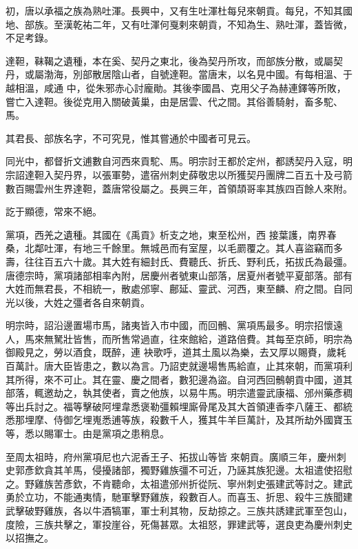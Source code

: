 \begin{pinyinscope}
 初，唐以承福之族為熟吐渾。長興中，又有生吐渾杜每兒來朝貢。每兒，不知其國地、部族。至漢乾祐二年，又有吐渾何戛剌來朝貢，不知為生、熟吐渾，蓋皆微，不足考錄。



 達靼，靺鞨之遺種，本在奚、契丹之東北，後為契丹所攻，而部族分散，或屬契丹，或屬渤海，別部散居陰山者，自號達靼。當唐末，以名見中國。有每相溫、于越相溫，咸通
 中，從朱邪赤心討龐勛。其後李國昌、克用父子為赫連鐸等所敗，嘗亡入達靼。後從克用入關破黃巢，由是居雲、代之間。其俗善騎射，畜多駝、馬。



 其君長、部族名字，不可究見，惟其嘗通於中國者可見云。



 同光中，都督折文逋數自河西來貢駝、馬。明宗討王都於定州，都誘契丹入寇，明宗詔達靼入契丹界，以張軍勢，遣宿州刺史薛敬忠以所獲契丹團牌二百五十及弓箭數百賜雲州生界達靼，蓋唐常役屬之。長興三年，首領頡哥率其族四百餘人來附。



 訖于顯德，常來不絕。



 黨項，西羌之遺種。其國在《禹貢》析支之地，東至松州，西
 接葉護，南界春桑，北鄰吐渾，有地三千餘里。無城邑而有室屋，以毛罽覆之。其人喜盜竊而多壽，往往百五六十歲。其大姓有細封氏、費聽氏、折氏、野利氏，拓拔氏為最彊。唐德宗時，黨項諸部相率內附，居慶州者號東山部落，居夏州者號平夏部落。部有大姓而無君長，不相統一，散處邠寧、鄜延、靈武、河西，東至麟、府之間。自同光以後，大姓之彊者各自來朝貢。



 明宗時，詔沿邊置場市馬，諸夷皆入市中國，而回鶻、黨項馬最多。明宗招懷遠人，馬來無駑壯皆售，而所售常過直，往來館給，道路倍費。其每至京師，明宗為御殿見之，勞以酒食，既醉，連
 袂歌呼，道其土風以為樂，去又厚以賜賚，歲耗百萬計。唐大臣皆患之，數以為言。乃詔吏就邊場售馬給直，止其來朝，而黨項利其所得，來不可止。其在靈、慶之間者，數犯邊為盜。自河西回鶻朝貢中國，道其部落，輒邀劫之，執其使者，賣之他族，以易牛馬。明宗遣靈武康福、邠州藥彥稠等出兵討之。福等擊破阿埋韋悉褒勒彊賴埋廝骨尾及其大首領連香李八薩王、都統悉那埋摩、侍御乞埋嵬悉逋等族，殺數千人，獲其牛羊巨萬計，及其所劫外國寶玉等，悉以賜軍士。由是黨項之患稍息。



 至周太祖時，府州黨項尼也六泥香王子、拓拔山等皆
 來朝貢。廣順三年，慶州刺史郭彥欽貪其羊馬，侵擾諸部，獨野雞族彊不可近，乃誣其族犯邊。太祖遣使招慰之。野雞族苦彥欽，不肯聽命，太祖遣邠州折從阮、寧州刺史張建武等討之。建武勇於立功，不能通夷情，馳軍擊野雞族，殺數百人。而喜玉、折思、殺牛三族聞建武擊破野雞族，各以牛酒犒軍，軍士利其物，反劫掠之。三族共誘建武軍至包山，度險，三族共擊之，軍投崖谷，死傷甚眾。太祖怒，罪建武等，選良吏為慶州刺史以招撫之。




\end{pinyinscope}

